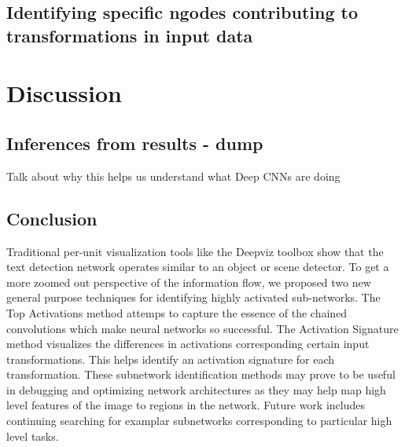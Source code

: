 \documentclass[10pt,twocolumn,letterpaper]{article}
\begin{document}
\subsection{Identifying specific ngodes contributing to transformations in input data}

\section{Discussion}

\subsection{Inferences from results - dump}
Talk about why this helps us understand what Deep CNNs are doing


\subsection{Conclusion}
Traditional per-unit visualization tools like the Deepviz toolbox \cite{} show that the text detection network operates similar to an object or scene detector. To get a more zoomed out perspective of the information flow, we proposed two new general purpose techniques for identifying highly activated sub-networks. The Top Activations method attemps to capture the essence of the chained convolutions which make neural networks so successful. The Activation Signature method visualizes the differences in activations corresponding certain input transformations. This helps identify an activation signature for each transformation. These subnetwork identification methods may prove to be useful in debugging and optimizing network architectures as they may help map high level features of the image to regions in the network. Future work includes continuing searching for examplar subnetworks corresponding to particular high level tasks.


{\small


}
\end{document}
